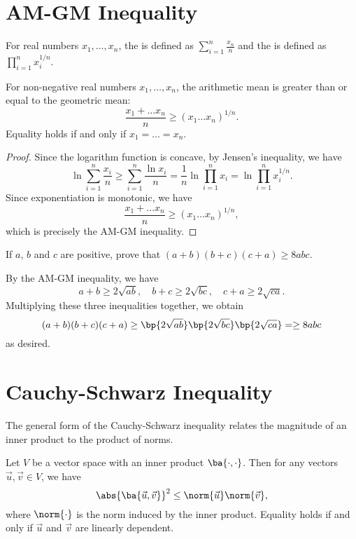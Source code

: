 \section{AM-GM Inequality}

\begin{definition}
    For real numbers $x_1, \dots, x_n$, the  is defined as $\sum_{i = 1}^n \frac{x_n}{n}$ and the  is defined as $\prod_{i = 1}^n x_i^{1/n}$.
\end{definition}

\begin{theorem}[AM-GM Inequality]
    For non-negative real numbers $x_1, \dots, x_n$, the arithmetic mean is greater than or equal to the geometric mean: \[\frac{x_1 + \dots x_n}{n} \geq (x_1 \dots x_n)^{1/n}.\] Equality holds if and only if $x_1 = \dots = x_n$.
\end{theorem}
\begin{proof}
    Since the logarithm function is concave, by Jensen's inequality, we have \[\ln{\sum_{i = 1}^n \frac{x_i}n} \geq \sum_{i = 1}^n \frac{\ln{x_i}}n = \frac1n \ln{\prod_{i = 1}^n x_i} = \ln{\prod_{i = 1}^n x_i^{1/n}}.\] Since exponentiation is monotonic, we have \[\frac{x_1 + \dots x_n}{n} \geq (x_1 \dots x_n)^{1/n},\] which is precisely the AM-GM inequality.
\end{proof}

\begin{sample}
    If $a$, $b$ and $c$ are positive, prove that $(a+b)(b+c)(c+a) \geq 8abc$.
\end{sample}
\begin{sampans}
    By the AM-GM inequality, we have \[a + b \geq 2\sqrt{ab}, \quad b + c \geq 2\sqrt{bc}, \quad c + a \geq 2\sqrt{ca}.\] Multiplying these three inequalities together, we obtain \[(a+b)(b+c)(c+a) \geq \bp{2\sqrt{ab}}\bp{2\sqrt{bc}}\bp{2\sqrt{ca}} = \geq 8abc\] as desired.
\end{sampans}

\section{Cauchy-Schwarz Inequality}

The general form of the Cauchy-Schwarz inequality relates the magnitude of an inner product to the product of norms.

\begin{theorem}
    Let $V$ be a vector space with an inner product $\ba{\cdot, \cdot}$. Then for any vectors $\vec u, \vec v \in V$, we have \[\abs{\ba{\vec u, \vec v}}^2 \leq \norm{\vec u} \norm{\vec v},\] where $\norm{\cdot}$ is the norm induced by the inner product. Equality holds if and only if $\vec u$ and $\vec v$ are linearly dependent.
\end{theorem}

